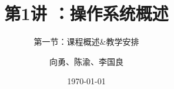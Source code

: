 


\title[第1讲]{第1讲 ：操作系统概述} %
\subtitle{第一节：课程概述\&教学安排}
\author{向勇、陈渝、李国良} %
\date{\today} %



\begin{frame}
\titlepage %
\end{frame}

